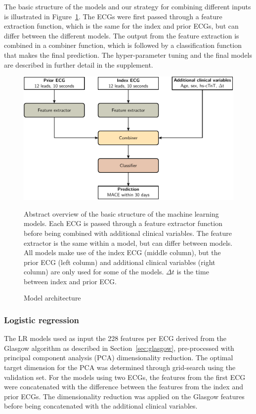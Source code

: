 \documentclass[preprint]{elsarticle}
\begin{document}
The basic structure of the models and our strategy for combining different inputs is illustrated in Figure~\ref{fig:model:overview}. The ECGs were first passed through a feature extraction function, which is the same for the index and prior ECGs, but can differ between the different models. The output from the feature extraction is combined in a combiner function, which is followed by a classification function that makes the final prediction. The hyper-parameter tuning and the final models are described in further detail in the supplement.

\begin{figure}[h!]
\includegraphics[width=\linewidth]{figures/overview.pdf}
\centering
\caption{Model architecture}
\medskip
\small
Abstract overview of the basic structure of the machine learning models. Each ECG is passed through a feature extractor function before being combined with additional clinical variables. The feature extractor is the same within a model, but can differ between models. All models make use of the index ECG (middle column), but the prior ECG (left column) and additional clinical variables (right column) are only used for some of the models.  $\Delta t$ is the time between index and prior ECG. 
\label{fig:model:overview}
\end{figure}

\subsubsection{Logistic regression}
The LR models used as input the 228 features per ECG derived from the Glasgow algorithm as described in Section~\ref{sec:glasgow}, pre-processed with principal component analysis (PCA) dimensionality reduction. The optimal target dimension for the PCA was determined through grid-search using the validation set. For the models using two ECGs, the features from the first ECG were concatenated with the difference between the features from the index and prior ECGs. The dimensionality reduction was applied on the Glasgow features before being concatenated with the additional clinical variables.
\end{document}
